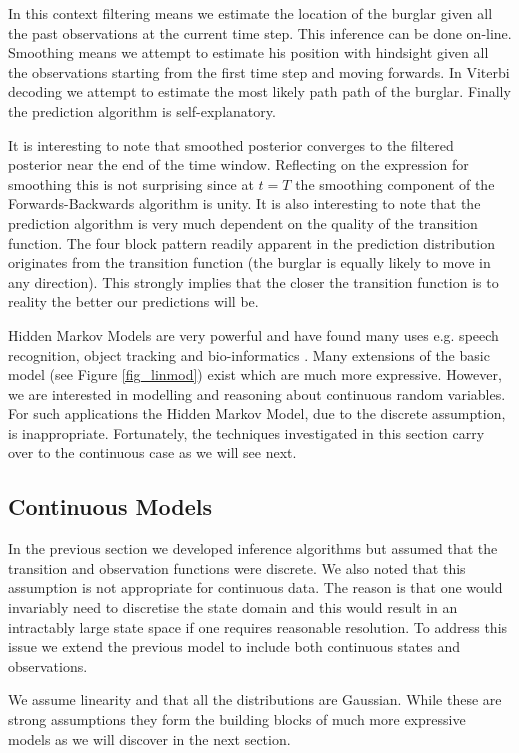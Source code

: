 \documentclass[../masters.tex]{subfiles}
\begin{document}
In this context filtering means we estimate the location of the burglar given all the past observations at the current time step. This inference can be done on-line. Smoothing means we attempt to estimate his position with hindsight given all the observations starting from the first time step and moving forwards. In Viterbi decoding we attempt to estimate the most likely path path of the burglar. Finally the prediction algorithm is self-explanatory.

It is interesting to note that smoothed posterior converges to the filtered posterior near the end of the time window. Reflecting on the expression for smoothing this is not surprising since at $t=T$ the smoothing component of the Forwards-Backwards algorithm is unity. It is also interesting to note that the prediction algorithm is very much dependent on the quality of the transition function. The four block pattern readily apparent in the prediction distribution originates from the transition function (the burglar is equally likely to move in any direction). This strongly implies that the closer the transition function is to reality the better our predictions will be. 

Hidden Markov Models are very powerful and have found many uses e.g. speech recognition, object tracking and bio-informatics \cite{barber}. Many extensions of the basic model (see Figure \ref{fig_linmod}) exist which are much more expressive. However, we are interested in modelling and reasoning about continuous random variables. For such applications the Hidden Markov Model, due to the discrete assumption, is inappropriate. Fortunately, the techniques investigated in this section carry over to the continuous case as we will see next.  

\subsection{Continuous Models}
In the previous section we developed inference algorithms but assumed that the transition and observation functions were discrete. We also noted that this assumption is not appropriate for continuous data. The reason is that one would invariably need to discretise the state domain and this would result in an intractably large state space if one requires reasonable resolution. To address this issue we extend the previous model to include both continuous states and observations. 

We assume linearity and that all the distributions are Gaussian. While these are strong assumptions they form the building blocks of much more expressive models as we will discover in the next section. 
%
%
%
\end{document}
